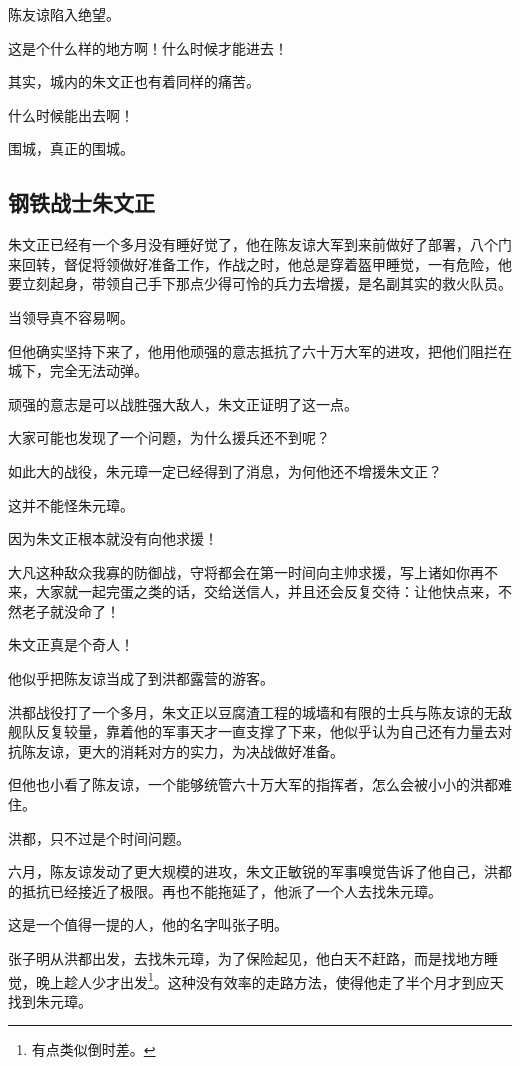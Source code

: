 \begin{multicols}{\theparacolNo}
		陈友谅陷入绝望。

		这是个什么样的地方啊！什么时候才能进去！

		其实，城内的朱文正也有着同样的痛苦。

		什么时候能出去啊！

		围城，真正的围城。

		\subsection{钢铁战士朱文正}
		朱文正已经有一个多月没有睡好觉了，他在陈友谅大军到来前做好了部署，八个门来回转，督促将领做好准备工作，作战之时，他总是穿着盔甲睡觉，一有危险，他要立刻起身，带领自己手下那点少得可怜的兵力去增援，是名副其实的救火队员。

		当领导真不容易啊。

		但他确实坚持下来了，他用他顽强的意志抵抗了六十万大军的进攻，把他们阻拦在城下，完全无法动弹。

		顽强的意志是可以战胜强大敌人，朱文正证明了这一点。

		大家可能也发现了一个问题，为什么援兵还不到呢？

		如此大的战役，朱元璋一定已经得到了消息，为何他还不增援朱文正？

		这并不能怪朱元璋。

		因为朱文正根本就没有向他求援！

		大凡这种敌众我寡的防御战，守将都会在第一时间向主帅求援，写上诸如你再不来，大家就一起完蛋之类的话，交给送信人，并且还会反复交待：让他快点来，不然老子就没命了！

		朱文正真是个奇人！

		他似乎把陈友谅当成了到洪都露营的游客。

		洪都战役打了一个多月，朱文正以豆腐渣工程的城墙和有限的士兵与陈友谅的无敌舰队反复较量，靠着他的军事天才一直支撑了下来，他似乎认为自己还有力量去对抗陈友谅，更大的消耗对方的实力，为决战做好准备。

		但他也小看了陈友谅，一个能够统管六十万大军的指挥者，怎么会被小小的洪都难住。

		洪都，只不过是个时间问题。

		六月，陈友谅发动了更大规模的进攻，朱文正敏锐的军事嗅觉告诉了他自己，洪都的抵抗已经接近了极限。再也不能拖延了，他派了一个人去找朱元璋。

		这是一个值得一提的人，他的名字叫张子明。

		张子明从洪都出发，去找朱元璋，为了保险起见，他白天不赶路，而是找地方睡觉，晚上趁人少才出发\footnote{有点类似倒时差。}。这种没有效率的走路方法，使得他走了半个月才到应天找到朱元璋。


\end{multicols}
